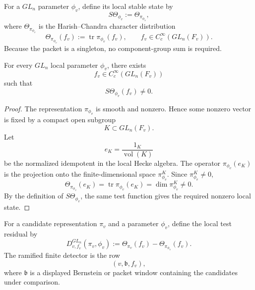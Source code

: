 \begin{definition}
\label{def:unified-reality-gln-stable-local-state}
For a $GL_n$ parameter $\phi_v$, define its local stable state by
$$
S\Theta_{\phi_v}
:=
\Theta_{\pi_{\phi_v}},
$$
where $\Theta_{\pi_{\phi_v}}$ is the Harish--Chandra character
distribution
$$
\Theta_{\pi_{\phi_v}}(f_v)
:=
\operatorname{tr}\pi_{\phi_v}(f_v),
\qquad
f_v\in C_c^\infty(GL_n(F_v)).
$$
Because the packet is a singleton, no component-group sum is required.
\end{definition}

\begin{theorem}
\label{thm:unified-reality-gln-local-state-nonzero}
For every $GL_n$ local parameter $\phi_v$, there exists
$$
f_v\in C_c^\infty(GL_n(F_v))
$$
such that
$$
S\Theta_{\phi_v}(f_v)\ne0.
$$
\end{theorem}
\begin{proof}
The representation $\pi_{\phi_v}$ is smooth and nonzero. Hence some
nonzero vector is fixed by a compact open subgroup
$$
K\subset GL_n(F_v).
$$
Let
$$
e_K=\frac{1_K}{\operatorname{vol}(K)}
$$
be the normalized idempotent in the local Hecke algebra. The operator
$\pi_{\phi_v}(e_K)$ is the projection onto the finite-dimensional space
$\pi_{\phi_v}^K$. Since $\pi_{\phi_v}^K\ne0$,
$$
\Theta_{\pi_{\phi_v}}(e_K)
=
\operatorname{tr}\pi_{\phi_v}(e_K)
=
\dim \pi_{\phi_v}^K
\ne0.
$$
By the definition of $S\Theta_{\phi_v}$, the same test function gives
the required nonzero local state.
\end{proof}

\begin{definition}
\label{def:unified-reality-gln-local-test-residual}
For a candidate representation $\pi_v$ and a parameter $\phi_v$, define
the local test residual by
$$
D^{GL_n}_{v,f_v}(\pi_v,\phi_v)
:=
\Theta_{\pi_v}(f_v)-\Theta_{\pi_{\phi_v}}(f_v).
$$
The ramified finite detector is the row
$$
(v,\mathfrak b,f_v),
$$
where $\mathfrak b$ is a displayed Bernstein or packet window containing
the candidates under comparison.
\end{definition}

